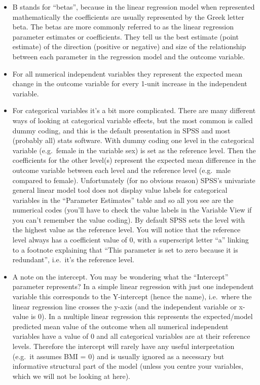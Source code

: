 \documentclass[
]{book}
\begin{document}
\begin{itemize}
\item
  B stands for ``betas'', because in the linear regression model when represented mathematically the coefficients are usually represented by the Greek letter beta. The betas are more commonly referred to as the linear regression parameter estimates or coefficients. They tell us the best estimate (point estimate) of the direction (positive or negative) and size of the relationship between each parameter in the regression model and the outcome variable.
\item
  For all numerical independent variables they represent the expected mean change in the outcome variable for every 1-unit increase in the independent variable.
\item
  For categorical variables it's a bit more complicated. There are many different ways of looking at categorical variable effects, but the most common is called dummy coding, and this is the default presentation in SPSS and most (probably all) stats software. With dummy coding one level in the categorical variable (e.g.~female in the variable sex) is set as the reference level. Then the coefficients for the other level(s) represent the expected mean difference in the outcome variable between each level and the reference level (e.g.~male compared to female). Unfortunately (for no obvious reason) SPSS's univariate general linear model tool does not display value labels for categorical variables in the ``Parameter Estimates'' table and so all you see are the numerical codes (you'll have to check the value labels in the Variable View if you can't remember the value coding). By default SPSS sets the level with the highest value as the reference level. You will notice that the reference level always has a coefficient value of 0, with a superscript letter ``a'' linking to a footnote explaining that ``This parameter is set to zero because it is redundant'', i.e.~it's the reference level.
\item
  A note on the intercept. You may be wondering what the ``Intercept'' parameter represents? In a simple linear regression with just one independent variable this corresponds to the Y-intercept (hence the name), i.e.~where the linear regression line crosses the y-axis (and the independent variable or x-value is 0). In a multiple linear regression this represents the expected/model predicted mean value of the outcome when all numerical independent variables have a value of 0 and all categorical variables are at their reference levels. Therefore the intercept will rarely have any useful interpretation (e.g.~it assumes BMI = 0) and is usually ignored as a necessary but informative structural part of the model (unless you centre your variables, which we will not be looking at here).
\end{itemize}
\end{document}
